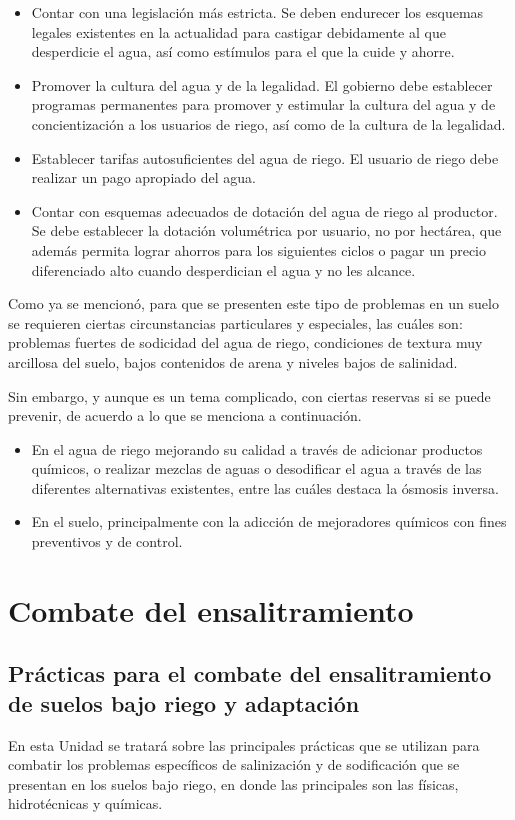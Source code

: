 \begin{itemize}
    \item Contar con una legislación más estricta. Se deben endurecer los esquemas legales existentes en la actualidad para castigar debidamente al que desperdicie el agua, así como estímulos para el que la cuide y ahorre.
    \item Promover la cultura del agua y de la legalidad. El gobierno debe establecer programas permanentes para promover y estimular la cultura del agua y de concientización a los usuarios de riego, así como de la cultura de la legalidad.
    \item Establecer tarifas autosuficientes del agua de riego. El usuario de riego debe realizar un pago apropiado del agua.
    \item Contar con esquemas adecuados de dotación del agua de riego al productor. Se debe establecer la dotación volumétrica por usuario, no por hectárea, que además permita lograr ahorros para los siguientes ciclos o pagar un precio diferenciado alto cuando desperdician el agua y no les alcance.    
\end{itemize}
Como ya se mencionó, para que se presenten este tipo de problemas en un suelo se requieren ciertas circunstancias particulares y especiales, las cuáles son: problemas fuertes de sodicidad del agua de riego, condiciones de textura muy arcillosa del suelo, bajos contenidos de arena y niveles bajos de salinidad.

Sin embargo, y aunque es un tema complicado, con ciertas reservas si se puede prevenir, de acuerdo a lo que se menciona a continuación.
\begin{itemize}
    \item En el agua de riego mejorando su calidad a través de adicionar productos químicos, o realizar mezclas de aguas o desodificar el agua a través de las diferentes alternativas existentes, entre las cuáles destaca la ósmosis inversa.
    \item En el suelo, principalmente con la adicción de mejoradores químicos con fines preventivos y de control.
\end{itemize}
\section{Combate del ensalitramiento}
\subsection{Prácticas para el combate del ensalitramiento de suelos bajo riego y adaptación}
En esta Unidad se tratará sobre las principales prácticas que se utilizan para combatir los problemas específicos de salinización y de sodificación que se presentan en los suelos bajo riego, en donde las principales son las físicas, hidrotécnicas y químicas.

